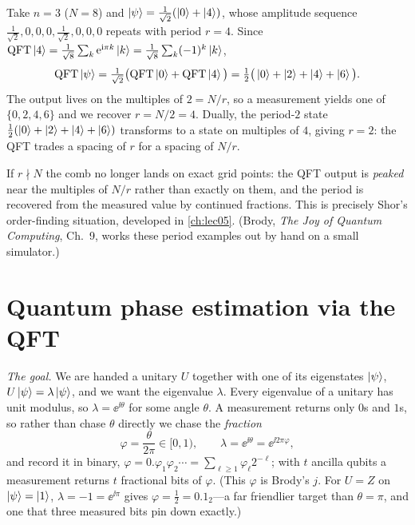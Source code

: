 \begin{example}
\label{ex:lec04-period}
Take $n=3$ ($N=8$) and $\ket{\psi}=\tfrac1{\sqrt2}(\ket{0}+\ket{4})$, whose amplitude
sequence $\tfrac1{\sqrt2},0,0,0,\tfrac1{\sqrt2},0,0,0$ repeats with period $r=4$. Since
$\mathrm{QFT}\ket{4}=\tfrac1{\sqrt8}\sum_k\mathrm{e}^{\mathrm{i}\pi k}\ket{k}=\tfrac1{\sqrt8}\sum_k(-1)^k\ket{k}$,
\[
  \mathrm{QFT}\ket{\psi}=\tfrac1{\sqrt2}\big(\mathrm{QFT}\ket0+\mathrm{QFT}\ket4\big)
  =\tfrac12\big(\ket0+\ket2+\ket4+\ket6\big).
\]
The output lives on the multiples of $2=N/r$, so a measurement yields one of
$\{0,2,4,6\}$ and we recover $r=N/2=4$. Dually, the period-$2$ state
$\tfrac12(\ket0+\ket2+\ket4+\ket6)$ transforms to a state on multiples of $4$, giving
$r=2$: the QFT trades a spacing of $r$ for a spacing of $N/r$.
\end{example}

\begin{remark}
\label{rem:lec04-period}
If $r\nmid N$ the comb no longer lands on exact grid points: the QFT output is
\emph{peaked} near the multiples of $N/r$ rather than exactly on them, and the period is
recovered from the measured value by continued fractions. This is precisely Shor's
order-finding situation, developed in \cref{ch:lec05}. (Brody, \emph{The Joy of Quantum
Computing}, Ch.~9, works these period examples out by hand on a small simulator.)
\end{remark}

\section{Quantum phase estimation via the QFT}
\label{sec:lec04-3}

\emph{The goal.} We are handed a unitary $U$ together with one of its eigenstates
$\ket{\psi}$, $U\ket{\psi}=\lambda\ket{\psi}$, and we want the eigenvalue $\lambda$.
Every eigenvalue of a unitary has unit modulus, so $\lambda=\ee^{\ii\theta}$ for some
angle $\theta$. A measurement returns only $0$s and $1$s, so rather than chase
$\theta$ directly we chase the \emph{fraction}
\begin{equation}
  \varphi=\frac{\theta}{2\pi}\in[0,1),\qquad
  \lambda=\ee^{\ii\theta}=\ee^{\ii 2\pi\varphi},
  \label{eq:lec04-phasefrac}
\end{equation}
and record it in binary, $\varphi=0.\varphi_1\varphi_2\cdots=\sum_{\ell\ge1}\varphi_\ell
2^{-\ell}$; with $t$ ancilla qubits a measurement returns $t$ fractional bits of
$\varphi$. (This $\varphi$ is Brody's $j$. For $U=Z$ on $\ket{\psi}=\ket1$,
$\lambda=-1=\ee^{\ii\pi}$ gives $\varphi=\tfrac12=0.1_2$---a far friendlier target than
$\theta=\pi$, and one that three measured bits pin down exactly.)

